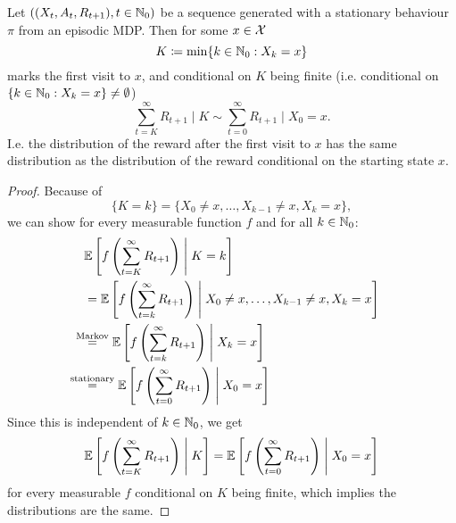 \begin{lemma}\label{appx8}
    Let \(((X_t,A_t,R_{t+1}),t\in\mathbb{N}_0)\) be a sequence generated with a stationary behaviour \(\pi\) from an episodic MDP. Then for some \(x\in\mathcal{X}\)
    \[
        K\coloneqq\min\{k\in\mathbb{N}_0:X_k=x\}
    \]
    marks the first visit to \(x\), and conditional on \(K\) being finite (i.e. conditional on \(\{k\in\mathbb{N}_0:X_k=x\}\neq \emptyset\))
    \[
        \sum_{t=K}^\infty R_{t+1}\;\Big|\; K \sim \sum_{t=0}^\infty R_{t+1} \;\Big|\; X_0=x.
    \]
    I.e. the distribution of the reward after the first visit to \(x\) has the same distribution as the distribution of the reward conditional on the starting state \(x\). 
\end{lemma}
\begin{proof}
    Because of
    \[
        \{K=k\}=\{ X_0\neq x, \dots, X_{k-1}\neq x, X_k=x\},
    \]
    we can show for every measurable function \(f\) and for all \(k\in\mathbb{N}_0\):
    \begin{align*}
        &\E\left[f\left(\sum_{t=K}^\infty R_{t+1}\right)\;\middle|\; K=k\right]\\
        &=\E\left[f\left(\sum_{t=k}^\infty R_{t+1}\right)\;\middle|\; X_0\neq x, \dots, X_{k-1}\neq x, X_k=x\right]\\
        &\lxeq{\text{Markov}} \E\left[f\left(\sum_{t=k}^\infty R_{t+1}\right)\;\middle|\; X_k=x\right]\\
        &\lxeq{\text{stationary}} \E\left[f\left(\sum_{t=0}^\infty R_{t+1}\right)\;\middle|\; X_0=x\right]
    \end{align*}
    Since this is independent of \(k\in \mathbb{N}_0\), we get
    \begin{align*}
        \mathbb{E}\left[f\left(\sum_{t=K}^\infty R_{t+1}\right)\;\middle|\; K\right]
        =\mathbb{E}\left[f\left(\sum_{t=0}^\infty R_{t+1}\right)\;\middle|\; X_0=x\right]
    \end{align*}
    for every measurable \(f\) conditional on \(K\) being finite, which implies the distributions are the same.
\end{proof}


